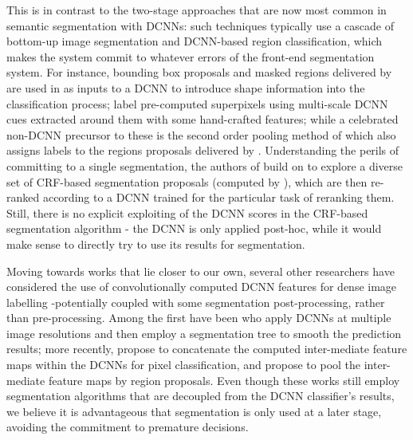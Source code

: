 
This is in contrast to the two-stage approaches that are now most common in semantic segmentation with DCNNs: such techniques typically use a cascade of bottom-up image segmentation and DCNN-based region classification, which makes the system commit to whatever errors of the front-end segmentation system.  
For instance, bounding box proposals and masked regions delivered by \citep{arbelaez2014multiscale, Uijlings13} are used in 
\citet{girshick2014rcnn, hariharan2014simultaneous}  as inputs to a DCNN to introduce  shape information into the classification process;  \citet{mostajabi2014feedforward} label pre-computed superpixels using multi-scale DCNN cues extracted around them with some hand-crafted features; while a celebrated  non-DCNN precursor to these 
is the second order pooling method of \citep{carreira2012semantic} which also assigns labels to the regions proposals delivered by \citep{carreira2012cpmc}. 
Understanding the perils of committing to a single segmentation, the authors of \citet{cogswell2014combining} 
build on \citep{yadollahpour2013discriminative} to explore a diverse set of CRF-based segmentation proposals (computed by \citep{carreira2012cpmc}), which are then re-ranked according to a DCNN trained for the particular task of reranking them.  Still, there is no explicit exploiting of the DCNN scores in  the CRF-based segmentation algorithm - the DCNN is only applied post-hoc, while it would make sense to directly try to use its results for segmentation. 


Moving towards works that lie closer to our own, several other researchers have considered the use of convolutionally computed DCNN features for dense image labelling -potentially coupled with some segmentation post-processing, rather than pre-processing. Among the first have been
\citet{farabet2013learning} who apply DCNNs at multiple image resolutions and then employ a segmentation tree to smooth the prediction results; more recently, \citet{hariharan2014hypercolumns} propose to concatenate the computed inter-mediate feature maps within the DCNNs for pixel classification, and \citet{dai2014convolutional} propose to pool the inter-mediate feature maps by region proposals. Even though these works still employ  segmentation algorithms that are  decoupled from the DCNN classifier's results, we believe it is advantageous that segmentation is only used at a later stage, avoiding the commitment  to premature decisions. 

